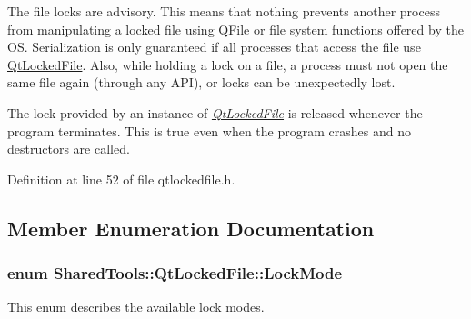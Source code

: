 The file locks are advisory. This means that nothing prevents another process from manipulating a locked file using Q\-File or file system functions offered by the O\-S. Serialization is only guaranteed if all processes that access the file use \hyperlink{class_shared_tools_1_1_qt_locked_file}{Qt\-Locked\-File}. Also, while holding a lock on a file, a process must not open the same file again (through any A\-P\-I), or locks can be unexpectedly lost.

The lock provided by an instance of {\itshape \hyperlink{class_shared_tools_1_1_qt_locked_file}{Qt\-Locked\-File}} is released whenever the program terminates. This is true even when the program crashes and no destructors are called. 

Definition at line 52 of file qtlockedfile.\-h.



\subsection{Member Enumeration Documentation}
\hypertarget{class_shared_tools_1_1_qt_locked_file_aaa69b096bf94afaae92f0ebcec10f2ed}{
\subsubsection[{Lock\-Mode}]{\setlength{\rightskip}{0pt plus 5cm}enum {\bf Shared\-Tools\-::\-Qt\-Locked\-File\-::\-Lock\-Mode}}}\label{class_shared_tools_1_1_qt_locked_file_aaa69b096bf94afaae92f0ebcec10f2ed}
This enum describes the available lock modes.

